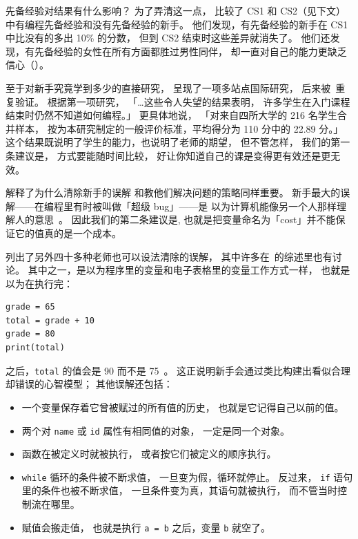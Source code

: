 先备经验对结果有什么影响？
为了弄清这一点，
\cite{Wilc2018}比较了 CS1 和 CS2（见下文）中有编程先备经验和没有先备经验的新手。
他们发现，有先备经验的新手在 CS1 中比没有的多出 10\% 的分数，
但到 CS2 结束时这些差异就消失了。
他们还发现，有先备经验的女性在所有方面都胜过男性同伴，
却一直对自己的能力更缺乏信心（）。

至于对新手究竟学到多少的直接研究，
\cite{McCr2001}呈现了一项多站点国际研究，
后来被~\cite{Utti2013}重复验证。
根据第一项研究，
「{\ldots}这些令人失望的结果表明，
许多学生在入门课程结束时仍然不知道如何编程。」
更具体地说，
「对来自四所大学的 216 名学生合并样本，
按为本研究制定的一般评价标准，平均得分为 110 分中的 22.89 分。」
这个结果既说明了学生的能力，也说明了老师的期望，
但不管怎样，
我们的第一条建议是，
方式要能随时间比较，
好让你知道自己的课是变得更有效还是更无效。


解释了为什么清除新手的误解
和教他们解决问题的策略同样重要。
新手最大的误解——在编程里有时被叫做「超级 bug」——是
以为计算机能像另一个人那样理解人的意思~\cite{Pea1986}。
因此我们的第二条建议是,
也就是把变量命名为「cost」并不能保证它的值真的是一个成本。

\cite{Sorv2018}列出了另外四十多种老师也可以设法清除的误解，
其中许多在~\cite{Qian2017}的综述里也有讨论。
其中之一，是以为程序里的变量和电子表格里的变量工作方式一样，
也就是以为在执行完：

\begin{verbatim}
grade = 65
total = grade + 10
grade = 80
print(total)
\end{verbatim}

\noindent
之后，\texttt{total} 的值会是 90 而不是 75~\cite{Kohn2017}。
这正说明新手会通过类比构建出看似合理却错误的心智模型；
其他误解还包括：

\begin{itemize}

\item
  一个变量保存着它曾被赋过的所有值的历史，
  也就是它记得自己以前的值。

\item
  两个对 \texttt{name} 或 \texttt{id} 属性有相同值的对象，
  一定是同一个对象。

\item
  函数在被定义时就被执行，
  或者按它们被定义的顺序执行。

\item
  \texttt{while} 循环的条件被不断求值，
  一旦变为假，循环就停止。
  反过来，
  \texttt{if} 语句里的条件也被不断求值，
  一旦条件变为真，其语句就被执行，
  而不管当时控制流在哪里。

\item
  赋值会搬走值，
  也就是执行 \texttt{a\ =\ b} 之后，变量 \texttt{b} 就空了。

\end{itemize}

